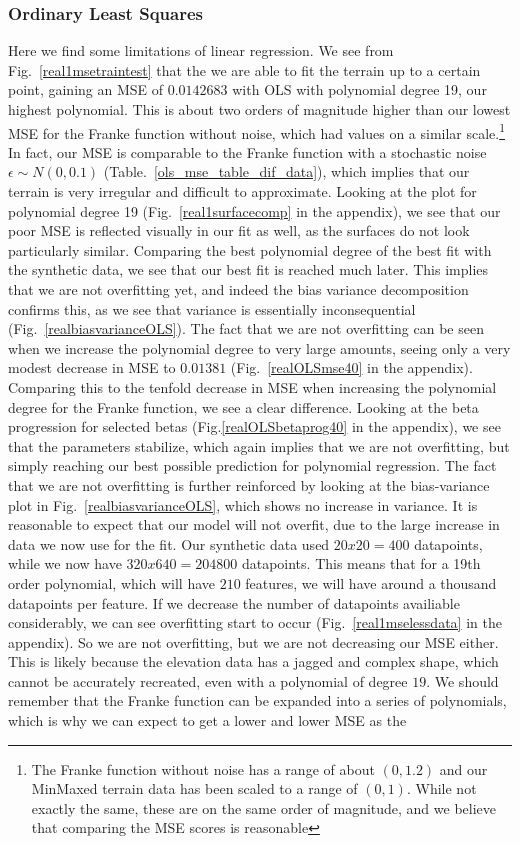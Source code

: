 \documentclass[twocolumn,10pt,cleanfoot]{asme2ej}
\begin{document}
\subsubsection{Ordinary Least Squares}

Here we find some limitations of linear regression. We see from Fig.~\ref{real1msetraintest} that the we are able to fit the terrain up to a certain point, gaining an MSE of $0.0142683$ with OLS with polynomial degree 19, our highest polynomial. This is about two orders of magnitude higher than our lowest MSE for the Franke function without noise, which had values on a similar scale.\footnote{The Franke function without noise has a range of about $(0,1.2)$ and our MinMaxed terrain data has been scaled to a range of $(0,1)$. While not exactly the same, these are on the same order of magnitude, and we believe that comparing the MSE scores is reasonable} In fact, our MSE is comparable to the Franke function with a stochastic noise $\epsilon \sim N(0,0.1)$ (Table.~\ref{ols_mse_table_dif_data}), which implies that our terrain is very irregular and difficult to approximate. Looking at the plot for polynomial degree 19 (Fig.~\ref{real1surfacecomp} in the appendix), we see that our poor MSE is reflected visually in our fit as well, as the surfaces do not look particularly similar. Comparing the best polynomial degree of the best fit with the synthetic data, we see that our best fit is reached much later. This implies that we are not overfitting yet, and indeed the bias variance decomposition confirms this, as we see that variance is essentially inconsequential (Fig.~\ref{realbiasvarianceOLS}). The fact that we are not overfitting can be seen when we increase the polynomial degree to very large amounts, seeing only a very modest decrease in MSE to $0.01381$ (Fig.~\ref{realOLSmse40} in the appendix). Comparing this to the tenfold decrease in MSE when increasing the polynomial degree for the Franke function, we see a clear difference. Looking at the beta progression for selected betas (Fig.\ref{realOLSbetaprog40} in the appendix), we see that the parameters stabilize, which again implies that we are not overfitting, but simply reaching our best possible prediction for polynomial regression. The fact that we are not overfitting is further reinforced by looking at the bias-variance plot in Fig.~\ref{realbiasvarianceOLS}, which shows no increase in variance. It is reasonable to expect that our model will not overfit, due to the large increase in data we now use for the fit. Our synthetic data used $20 x 20 = 400$ datapoints, while we now have $320 x 640 = 204 800$ datapoints. This means that for a 19th order polynomial, which will have $210$ features, we will have around a thousand datapoints per feature. If we decrease the number of datapoints availiable considerably, we can see overfitting start to occur (Fig.~\ref{real1mselessdata} in the appendix). So we are not overfitting, but we are not decreasing our MSE either. This is likely because the elevation data has a jagged and complex shape, which cannot be accurately recreated, even with a polynomial of degree $19$. We should remember that the Franke function can be expanded into a series of polynomials, which is why we can expect to get a lower and lower MSE as the 
\end{document}
